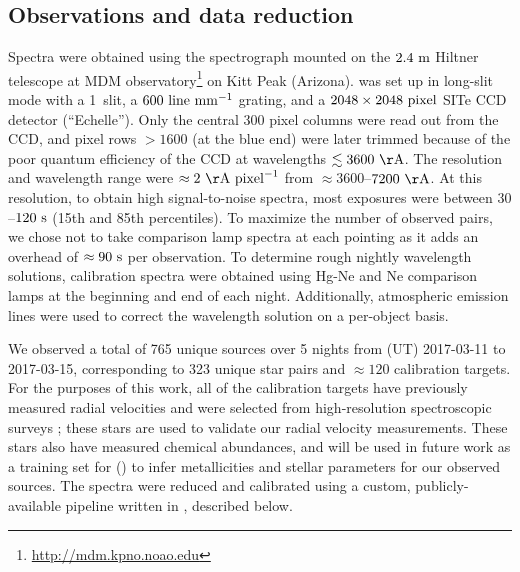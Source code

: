 \documentclass[modern, letterpaper]{aastex61}
\begin{document}
\subsection{Observations and data reduction}\label{sec:reduction}

Spectra were obtained using the  spectrograph mounted on the
$2.4~{\rm m}$ Hiltner telescope at MDM
observatory\footnote{\url{http://mdm.kpno.noao.edu}} on Kitt Peak (Arizona).
 was set up in long-slit mode with a 1\arcsec\ slit, a
$600~{\rm line}~{\rm mm}^{-1}$ grating, and a $2048\times2048~{\rm pixel}$ SITe
CCD detector (``Echelle'').
Only the central 300 pixel columns were read out from the CCD, and pixel rows
$>1600$ (at the blue end) were later trimmed because of the poor quantum
efficiency of the CCD at wavelengths $\lesssim 3600~{\rm \AA}$.
The resolution and wavelength range were $\approx2~{\rm \AA}~{\rm pixel}^{-1}$
from $\approx 3600$--$7200~{\rm \AA}$.
At this resolution, to obtain high signal-to-noise spectra, most exposures were
between $30$--$120~{\rm s}$ (15th and 85th percentiles).
To maximize the number of observed pairs, we chose not to take
comparison lamp spectra at each pointing as it adds an overhead of $\approx
90~{\rm s}$ per observation.
To determine rough nightly wavelength solutions, calibration spectra were
obtained using Hg-Ne and Ne comparison lamps at the beginning and end of each
night.
Additionally, atmospheric emission lines were used to correct the wavelength
solution on a per-object basis.

We observed a total of 765 unique sources over 5 nights from (UT) 2017-03-11 to
2017-03-15, corresponding to 323 unique star pairs and $\approx 120$
calibration targets.
For the purposes of this work, all of the calibration targets have previously
measured radial velocities and were selected from high-resolution spectroscopic
surveys \citealt{Bensby:2014,Pinsonneault:2014}; these stars are used to
validate our radial velocity measurements.
These stars also have measured chemical abundances, and will be used in future
work as a training set for  (\citealt{Ness:2015}) to infer
metallicities and stellar parameters for our observed sources.
The spectra were reduced and calibrated using a custom, publicly-available
pipeline written in \python, described below.
\end{document}
